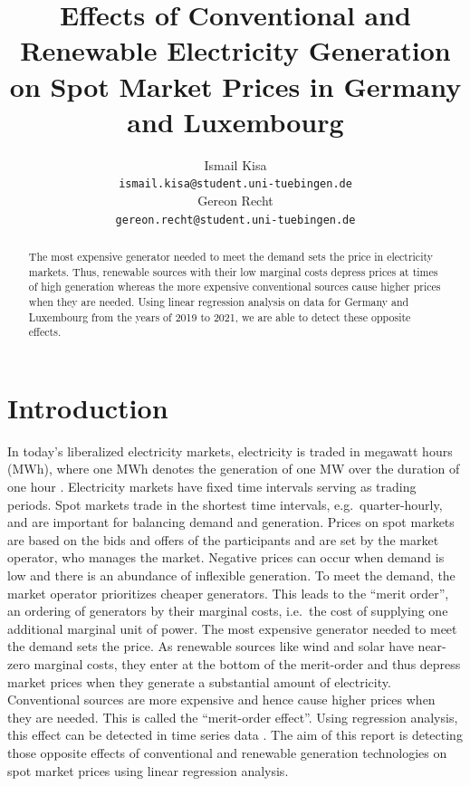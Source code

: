 \documentclass{article}
\title{Effects of Conventional and Renewable Electricity Generation on Spot Market Prices in Germany and Luxembourg}
\author{%
Ismail Kisa\\
\texttt{ismail.kisa@student.uni-tuebingen.de}\\
\And Gereon Recht\\
\texttt{gereon.recht@student.uni-tuebingen.de} \\
}
\begin{document}
\maketitle

\begin{abstract}
The most expensive generator needed to meet the demand sets the price in electricity markets.
Thus, renewable sources with their low marginal costs depress prices at times of high generation whereas the more expensive conventional sources cause higher prices when they are needed.
Using linear regression analysis on data for Germany and Luxembourg from the years of 2019 to 2021, we are able to detect these opposite effects.
\end{abstract}

\section{Introduction} \label{sec:intro}
In today's liberalized electricity markets, electricity is traded in megawatt hours (MWh), where one MWh denotes the generation of one MW over the duration of one hour \citep{markets_for_electrical_energy}.
Electricity markets have fixed time intervals serving as trading periods.
Spot markets trade in the shortest time intervals, e.g.\ quarter-hourly, and are important for balancing demand and generation. %
Prices on spot markets are based on the bids and offers of the participants and are set by the market operator, who manages the market.
Negative prices can occur when demand is low and there is an abundance of inflexible generation.
To meet the demand, the market operator prioritizes cheaper generators.
This leads to the \enquote{merit order}, an ordering of generators by their marginal costs, i.e.\ the cost of supplying one additional marginal unit of power.
The most expensive generator needed to meet the demand sets the price.
As renewable sources like wind and solar have near-zero marginal costs, they enter at the bottom of the merit-order and thus depress market prices when they generate a substantial amount of electricity.
Conventional sources are more expensive and hence cause higher prices when they are needed.
This is called the \enquote{merit-order effect}.
Using regression analysis, this effect can be detected in time series data \citep{merit_order_effect_renewable_generation}.
The aim of this report is detecting those opposite effects of conventional and renewable generation technologies on spot market prices using linear regression analysis.
\end{document}
